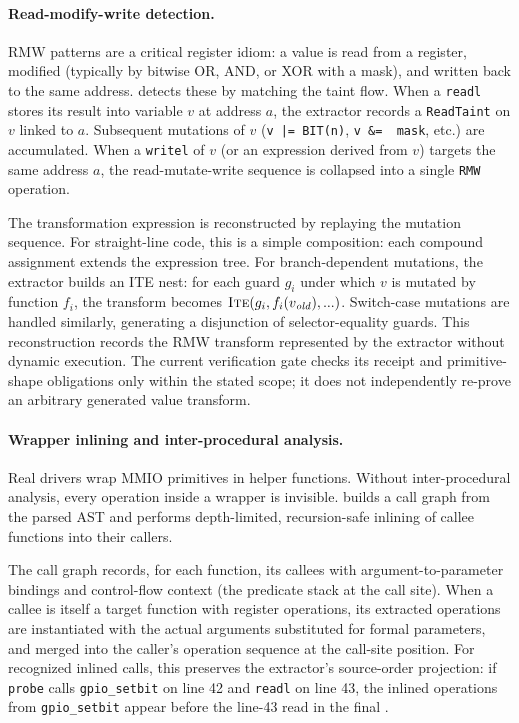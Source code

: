 \paragraph{Read-modify-write detection.}

RMW patterns are a critical register idiom: a value is read from a register, modified (typically by bitwise OR, AND, or XOR with a mask), and written back to the same address. \reharness{} detects these by matching the taint flow. When a \texttt{readl} stores its result into variable $v$ at address $a$, the extractor records a \texttt{ReadTaint} on $v$ linked to $a$. Subsequent mutations of $v$ (\texttt{v |= BIT(n)}, \texttt{v \&= ~mask}, etc.) are accumulated. When a \texttt{writel} of $v$ (or an expression derived from $v$) targets the same address $a$, the read-mutate-write sequence is collapsed into a single \texttt{RMW} operation.

The transformation expression is reconstructed by replaying the mutation sequence. For straight-line code, this is a simple composition: each compound assignment extends the expression tree. For branch-dependent mutations, the extractor builds an ITE nest: for each guard $g_i$ under which $v$ is mutated by function $f_i$, the transform becomes $\textsc{Ite}(g_i, f_i(v_{\mathit{old}}), ...)$. Switch-case mutations are handled similarly, generating a disjunction of selector-equality guards. This reconstruction records the RMW transform represented by the extractor without dynamic execution. The current verification gate checks its receipt and primitive-shape obligations only within the stated scope; it does not independently re-prove an arbitrary generated value transform.

\paragraph{Wrapper inlining and inter-procedural analysis.}

Real drivers wrap MMIO primitives in helper functions. Without inter-procedural analysis, every operation inside a wrapper is invisible. \reharness{} builds a call graph from the parsed AST and performs depth-limited, recursion-safe inlining of callee functions into their callers.

The call graph records, for each function, its callees with argument-to-parameter bindings and control-flow context (the predicate stack at the call site). When a callee is itself a target function with register operations, its extracted \rislang{} operations are instantiated with the actual arguments substituted for formal parameters, and merged into the caller's operation sequence at the call-site position. For recognized inlined calls, this preserves the extractor's source-order projection: if \texttt{probe} calls \texttt{gpio\_setbit} on line 42 and \texttt{readl} on line 43, the inlined operations from \texttt{gpio\_setbit} appear before the line-43 read in the final \rislang{}.


